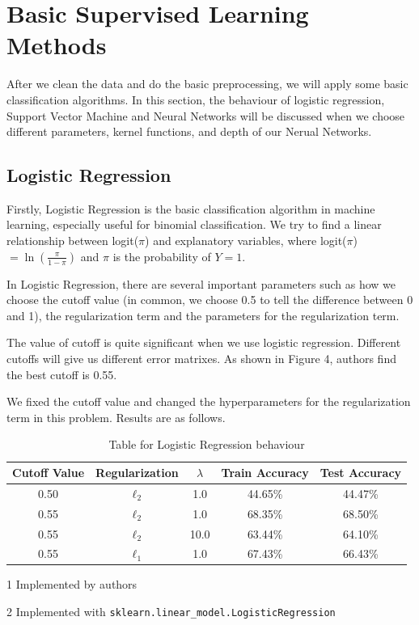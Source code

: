 \documentclass[a4paper,11pt,onecolumn,twoside]{article}
\begin{document}
\section{Basic Supervised Learning Methods}
After we clean the data and do the basic preprocessing, we will apply some basic classification algorithms. In this section, the behaviour of logistic regression, Support Vector Machine and Neural Networks will be discussed when we choose different parameters, kernel functions, and depth of our Nerual Networks.
\subsection{Logistic Regression}
Firstly, Logistic Regression is the basic classification algorithm in machine learning, especially useful for binomial classification.  We try to find a linear relationship between logit($\pi$) and explanatory variables, where logit($\pi$) $= \ln(\frac{\pi}{1-\pi})$ and $\pi$ is the probability of $Y=1$.
\par
In Logistic Regression, there are several important parameters such as how we choose the cutoff value (in common, we choose 0.5 to tell the difference between 0 and 1), the regularization term and the parameters for the regularization term.\par 
The value of cutoff is quite significant when we use logistic regression. Different cutoffs will give us different error matrixes. As shown in Figure 4, authors find the best cutoff is 0.55.\par 
We fixed the cutoff value and changed the hyperparameters for the regularization term in this problem. Results are as follows.
\begin{table}[htbp]
	\centering
	\begin{threeparttable}[b]
	\begin{tabular}{ccccc}
		\midrule[1.5pt]
	\textbf{Cutoff Value} &\textbf{Regularization}  &\textbf{$\lambda$}&\textbf{Train Accuracy}&\textbf{Test Accuracy}\\
		\hline
		0.50\tnote{1}&$\ell_2$&1.0&44.65\%&44.47\% \\
		0.55\tnote{2}&$\ell_2$&1.0&68.35\%&68.50\%\\
		0.55&$\ell_2$&10.0&63.44\%&64.10\%\\
		0.55&$\ell_1$&1.0&67.43\%&66.43\%\\
		\midrule[1.5pt]
	\end{tabular}
	\begin{tablenotes}
		\item [1] Implemented by authors
		\item [2] Implemented with \texttt{sklearn.linear\_model.LogisticRegression}
	\end{tablenotes}
	\end{threeparttable}
\caption{Table for Logistic Regression behaviour}
\end{table}
\end{document}
